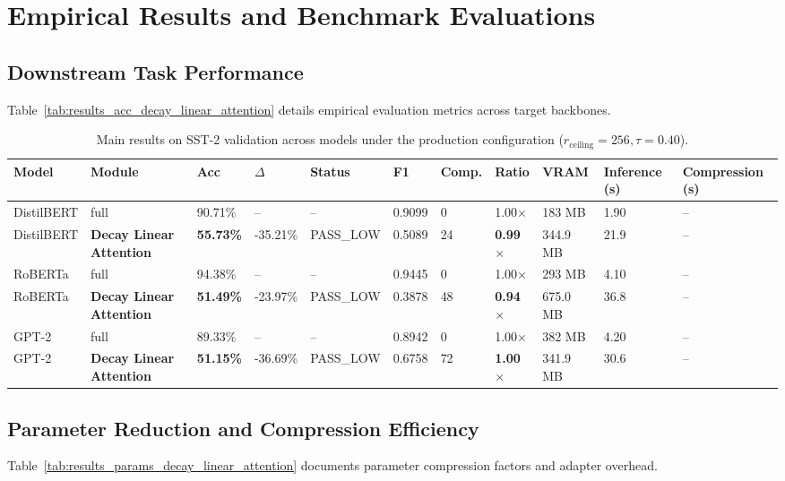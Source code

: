 \section{Empirical Results and Benchmark Evaluations}

\subsection{Downstream Task Performance}
Table~\ref{tab:results_acc_decay_linear_attention} details empirical evaluation metrics across target backbones.

\begin{table}[t]
\centering
\small
\begin{tabular}{lllllllllll}
\toprule
\textbf{Model} & \textbf{Module} & \textbf{Acc} & \textbf{$\Delta$} & \textbf{Status} & \textbf{F1} & \textbf{Comp.} & \textbf{Ratio} & \textbf{VRAM} & \textbf{Inference (s)} & \textbf{Compression (s)} \\
\midrule
DistilBERT & full & 90.71\% & -- & -- & 0.9099 & 0 & 1.00$\times$ & 183 MB & 1.90 & -- \\
DistilBERT & \textbf{Decay Linear Attention} & \textbf{55.73\%} & -35.21\% & PASS\_LOW & 0.5089 & 24 & \textbf{0.99$\times$} & 344.9 MB & 21.9 & -- \\
RoBERTa & full & 94.38\% & -- & -- & 0.9445 & 0 & 1.00$\times$ & 293 MB & 4.10 & -- \\
RoBERTa & \textbf{Decay Linear Attention} & \textbf{51.49\%} & -23.97\% & PASS\_LOW & 0.3878 & 48 & \textbf{0.94$\times$} & 675.0 MB & 36.8 & -- \\
GPT-2 & full & 89.33\% & -- & -- & 0.8942 & 0 & 1.00$\times$ & 382 MB & 4.20 & -- \\
GPT-2 & \textbf{Decay Linear Attention} & \textbf{51.15\%} & -36.69\% & PASS\_LOW & 0.6758 & 72 & \textbf{1.00$\times$} & 341.9 MB & 30.6 & -- \\
\bottomrule
\end{tabular}
\caption{Main results on SST-2 validation across models under the production configuration ($r_{\mathrm{ceiling}}=256, \tau=0.40$).}
\label{tab:main_sst2}
\end{table}

\subsection{Parameter Reduction and Compression Efficiency}
Table~\ref{tab:results_params_decay_linear_attention} documents parameter compression factors and adapter overhead.

